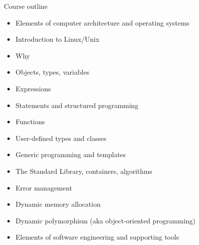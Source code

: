 \begin{frame}{Course outline}
  \begin{itemize}
  \item<1-> Elements of computer architecture and operating systems
  \item<2-> Introduction to Linux/Unix
  \item<3-> Why \Cpp{}
  \item<4-> Objects, types, variables
  \item<4-> Expressions
  \item<4-> Statements and structured programming
  \item<4-> Functions
  \item<4-> User-defined types and classes
  \item<4-> Generic programming and templates
  \item<4-> The Standard Library, containers, algorithms
  \item<4-> Error management
  \item<4-> Dynamic memory allocation
  \item<4-> Dynamic polymorphism (aka object-oriented programming)
  \item<5-> Elements of software engineering and supporting tools
  \end{itemize}
\end{frame}
